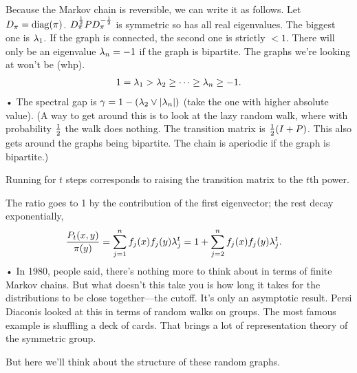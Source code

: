 Because the Markov chain is reversible, we can write it as follows. Let $D_\pi = \operatorname{diag}(\pi)$. $D_\pi^{\frac{1}{2}} PD_\pi^{-\frac{1}{2}}$ is symmetric so has all real eigenvalues. The biggest one is $\lambda_1$. If the graph is connected, the second one is strictly $<1$. There will only be an eigenvalue $\lambda_n=-1$ if the graph is bipartite. The graphs we're looking at won't be (whp). 
\begin{align}
1=\lambda_1>\lambda_2\ge \cdots \ge \lambda_n\ge -1.
\end{align}•
The spectral gap is $\gamma = 1-(\lambda_2 \vee|\lambda_n|)$ (take the one with higher absolute value).
(A way to get around this is to look at the lazy random walk, where with probability $\frac{1}{2}$ the walk does nothing. The transition matrix is $\frac{1}{2} (I+P)$. This also gets around the graphs being bipartite. The chain is aperiodic if the graph is bipartite.)

Running for $t$ steps corresponds to raising the transition matrix to the $t$th power.

The ratio goes to 1 by the contribution of the first eigenvector; the rest decay exponentially,
\begin{align}
\frac{P_t(x,y)}{\pi(y)}&=\sum_{j=1}^{n} f_j(x) f_j(y)\lambda_j^t = 1+\sum_{j=2}^n f_j(x)f_j(y) \lambda_j^t.
\end{align}•
In 1980, people said, there's nothing more to think about in terms of finite Markov chains.
But what doesn't this take you is how long it takes for the distributions to be close together---the cutoff. It's only an asymptotic result. Persi Diaconis looked at this in terms of random walks on groups. The most famous example is shuffling a deck of cards. That brings a lot of representation theory of the symmetric group.

But here we'll think about the structure of these random graphs.

